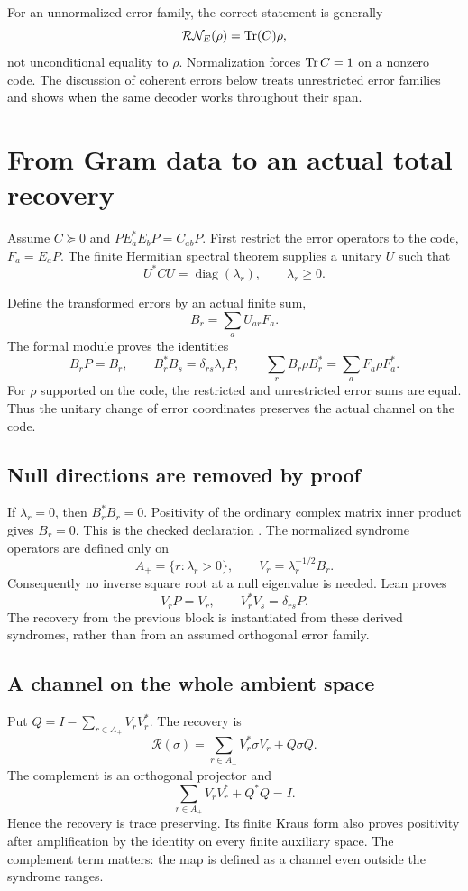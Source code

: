For an unnormalized error family, the correct statement is generally
\[
\mathcal R\mathcal N_E(\rho)=\Tr(C)\rho,
\]
not unconditional equality to $\rho$. Normalization forces $\operatorname{Tr} C=1$ on a nonzero code. The discussion of coherent errors below treats unrestricted error families and shows when the same decoder works throughout their span.



\section{From Gram data to an actual total recovery}\label{supp5:section:002}
Assume $C\succeq0$ and $PE_a^*E_bP=C_{ab}P$. First restrict the error operators to the code, $F_a=E_aP$. The finite Hermitian spectral theorem supplies a unitary $U$ such that
\[
U^*CU=\operatorname{diag}(\lambda_r),\qquad \lambda_r\ge0.
\]


Define the transformed errors by an actual finite sum,
\[
B_r=\sum_a U_{ar}F_a.
\]
The formal module proves the identities
\[
B_rP=B_r,\qquad B_r^*B_s=\delta_{rs}\lambda_rP,
\qquad \sum_rB_r\rho B_r^*=\sum_aF_a\rho F_a^*.
\]
For $\rho$ supported on the code, the restricted and unrestricted error sums are equal. Thus the unitary change of error coordinates preserves the actual channel on the code.

\subsection{Null directions are removed by proof}
If $\lambda_r=0$, then $B_r^*B_r=0$. Positivity of the ordinary complex matrix inner product gives $B_r=0$. This is the checked declaration . The normalized syndrome operators are defined only on
\[
A_+=\{r:\lambda_r>0\},\qquad V_r=\lambda_r^{-1/2}B_r.
\]
Consequently no inverse square root at a null eigenvalue is needed. Lean proves
\[
V_rP=V_r,\qquad V_r^*V_s=\delta_{rs}P.
\]
The recovery from the previous block is instantiated from these derived syndromes, rather than from an assumed orthogonal error family.

\subsection{A channel on the whole ambient space}
Put $Q=I-\sum_{r\in A_+}V_rV_r^*$. The recovery is
\[
\boxed{\mathcal R(\sigma)=\sum_{r\in A_+}V_r^*\sigma V_r+Q\sigma Q.}
\]
The complement is an orthogonal projector and
\[
\sum_{r\in A_+}V_rV_r^*+Q^*Q=I.
\]
Hence the recovery is trace preserving. Its finite Kraus form also proves positivity after amplification by the identity on every finite auxiliary space. The complement term matters: the map is defined as a channel even outside the syndrome ranges.

